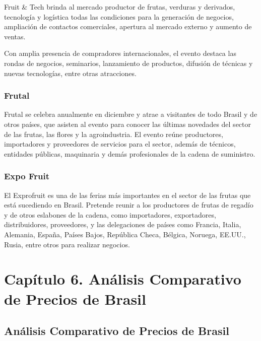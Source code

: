 \documentclass[
  stu,
  floatsintext,
  longtable,
  a4paper,
  nolmodern,
  notxfonts,
  notimes,
  12pt,
  colorlinks=true,linkcolor=blue,citecolor=blue,urlcolor=blue]{apa7}
\begin{document}
Fruit \& Tech brinda al mercado productor de frutas, verduras y
derivados, tecnología y logística todas las condiciones para la
generación de negocios, ampliación de contactos comerciales, apertura al
mercado externo y aumento de ventas.

Con amplia presencia de compradores internacionales, el evento destaca
las rondas de negocios, seminarios, lanzamiento de productos, difusión
de técnicas y nuevas tecnologías, entre otras atracciones.

\subsubsection{Frutal}\label{frutal}

Frutal se celebra anualmente en diciembre y atrae a visitantes de todo
Brasil y de otros países, que asisten al evento para conocer las últimas
novedades del sector de las frutas, las flores y la agroindustria. El
evento reúne productores, importadores y proveedores de servicios para
el sector, además de técnicos, entidades públicas, maquinaria y demás
profesionales de la cadena de suministro.

\subsubsection{Expo Fruit}\label{expo-fruit}

El Exprofruit es una de las ferias más importantes en el sector de las
frutas que está sucediendo en Brasil. Pretende reunir a los productores
de frutas de regadío y de otros eslabones de la cadena, como
importadores, exportadores, distribuidores, proveedores, y las
delegaciones de países como Francia, Italia, Alemania, España, Países
Bajos, República Checa, Bélgica, Noruega, EE.UU., Rusia, entre otros
para realizar negocios.

\section{Capítulo 6. Análisis Comparativo de Precios de
Brasil}\label{capuxedtulo-6.-anuxe1lisis-comparativo-de-precios-de-brasil}

\subsection{Análisis Comparativo de Precios de
Brasil}\label{anuxe1lisis-comparativo-de-precios-de-brasil}
\end{document}
